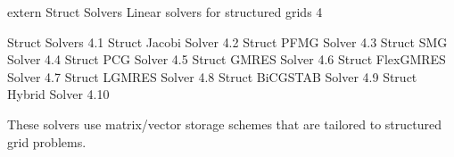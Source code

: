 \documentclass{article}
\begin{document}
\begin{cxxentry}
{extern }
        {Struct Solvers}
        {}
        {Linear solvers for structured grids}
        {4}
\begin{cxxnames}
\cxxitem{}
        {Struct Solvers}
        {}
        {
}
        {4.1}
\cxxitem{}
        {Struct Jacobi Solver}
        {}
        {
}
        {4.2}
\cxxitem{}
        {Struct PFMG Solver}
        {}
        {
}
        {4.3}
\cxxitem{}
        {Struct SMG Solver}
        {}
        {
}
        {4.4}
\cxxitem{}
        {Struct PCG Solver}
        {}
        {
}
        {4.5}
\cxxitem{}
        {Struct GMRES Solver}
        {}
        {
}
        {4.6}
\cxxitem{}
        {Struct FlexGMRES Solver}
        {}
        {
}
        {4.7}
\cxxitem{}
        {Struct LGMRES Solver}
        {}
        {
}
        {4.8}
\cxxitem{}
        {Struct BiCGSTAB Solver}
        {}
        {
}
        {4.9}
\cxxitem{}
        {Struct Hybrid Solver}
        {}
        {
}
        {4.10}
\end{cxxnames}
\begin{cxxdoc}


These solvers use matrix/vector storage schemes that are tailored
to structured grid problems.



\end{cxxdoc}
\end{cxxentry}
\end{document}
